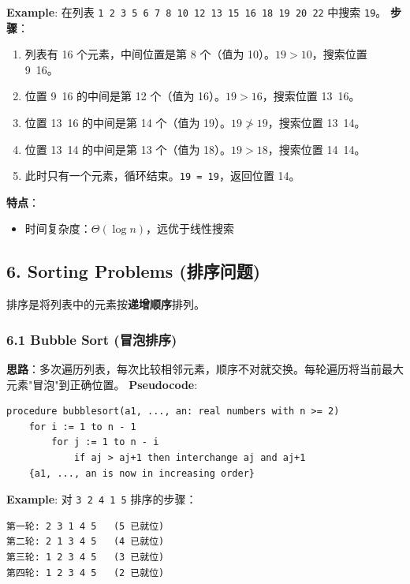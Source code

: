 \documentclass[10pt,a4paper,openany]{ctexbook}
\theoremstyle{definition}
\theoremstyle{remark}
\renewenvironment{quote}
  {\list{}{\leftmargin=1em\rightmargin=0pt\topsep=0.5pt\partopsep=0pt}\item[]}
  {\endlist}
\begin{document}
\textbf{Example}: 在列表 \texttt{1 2 3 5 6 7 8 10 12 13 15 16 18 19 20 22} 中搜索 \texttt{19}。
\textbf{步骤}：
\begin{enumerate}
\item 列表有 16 个元素，中间位置是第 8 个（值为 10）。$19 > 10$，搜索位置 9~16。
\item 位置 9~16 的中间是第 12 个（值为 16）。$19 > 16$，搜索位置 13~16。
\item 位置 13~16 的中间是第 14 个（值为 19）。$19 \not> 19$，搜索位置 13~14。
\item 位置 13~14 的中间是第 13 个（值为 18）。$19 > 18$，搜索位置 14~14。
\item 此时只有一个元素，循环结束。\texttt{19 = 19}，返回位置 14。

\end{enumerate}

\textbf{特点}：
\begin{itemize}
\item 时间复杂度：$\Theta(\log n)$，远优于线性搜索

\end{itemize}

\vspace{-2pt}

\subsection{6. Sorting Problems (排序问题)}

\begin{quote}
排序是将列表中的元素按\textbf{递增顺序}排列。

\end{quote}

\subsubsection{6.1 Bubble Sort (冒泡排序)}

\textbf{思路}：多次遍历列表，每次比较相邻元素，顺序不对就交换。每轮遍历将当前最大元素"冒泡"到正确位置。
\textbf{Pseudocode}:
{\footnotesize\begin{verbatim}
procedure bubblesort(a1, ..., an: real numbers with n >= 2)
    for i := 1 to n - 1
        for j := 1 to n - i
            if aj > aj+1 then interchange aj and aj+1
    {a1, ..., an is now in increasing order}
\end{verbatim}}

\textbf{Example}: 对 \texttt{3 2 4 1 5} 排序的步骤：
{\footnotesize\begin{verbatim}
第一轮: 2 3 1 4 5   (5 已就位)
第二轮: 2 1 3 4 5   (4 已就位)
第三轮: 1 2 3 4 5   (3 已就位)
第四轮: 1 2 3 4 5   (2 已就位)
\end{verbatim}}
\end{document}
